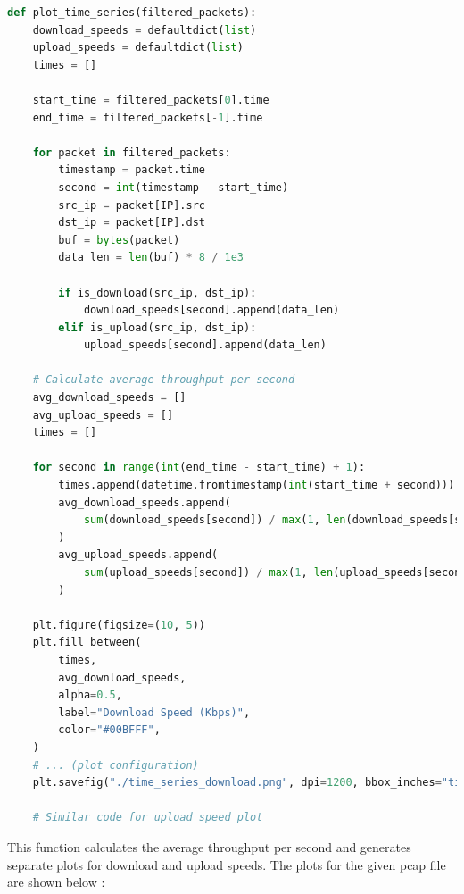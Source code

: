 \documentclass{article}
\begin{document}
\begin{lstlisting}[language=Python]
def plot_time_series(filtered_packets):
    download_speeds = defaultdict(list)
    upload_speeds = defaultdict(list)
    times = []

    start_time = filtered_packets[0].time
    end_time = filtered_packets[-1].time

    for packet in filtered_packets:
        timestamp = packet.time
        second = int(timestamp - start_time)
        src_ip = packet[IP].src
        dst_ip = packet[IP].dst
        buf = bytes(packet)
        data_len = len(buf) * 8 / 1e3

        if is_download(src_ip, dst_ip):
            download_speeds[second].append(data_len)
        elif is_upload(src_ip, dst_ip):
            upload_speeds[second].append(data_len)

    # Calculate average throughput per second
    avg_download_speeds = []
    avg_upload_speeds = []
    times = []

    for second in range(int(end_time - start_time) + 1):
        times.append(datetime.fromtimestamp(int(start_time + second)))
        avg_download_speeds.append(
            sum(download_speeds[second]) / max(1, len(download_speeds[second]))
        )
        avg_upload_speeds.append(
            sum(upload_speeds[second]) / max(1, len(upload_speeds[second]))
        )
    
    plt.figure(figsize=(10, 5))
    plt.fill_between(
        times,
        avg_download_speeds,
        alpha=0.5,
        label="Download Speed (Kbps)",
        color="#00BFFF",
    )
    # ... (plot configuration)
    plt.savefig("./time_series_download.png", dpi=1200, bbox_inches="tight")
    
    # Similar code for upload speed plot
\end{lstlisting}

This function calculates the average throughput per second and generates separate plots for download and upload speeds. The plots for the given pcap file are shown below :
\end{document}
